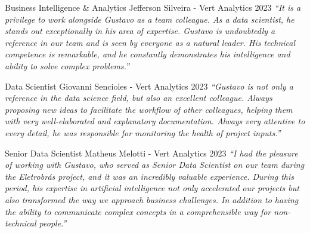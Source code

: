 \begin{cventries}
  \cventry
    {Business Intelligence \& Analytics} %
    {Jefferson Silveira - Vert Analytics} %
    {2023} %
    {} %
    {
      \textit{``It is a privilege to work alongside Gustavo as a team colleague. As a data scientist, he stands out exceptionally in his area of expertise. Gustavo is undoubtedly a reference in our team and is seen by everyone as a natural leader. His technical competence is remarkable, and he constantly demonstrates his intelligence and ability to solve complex problems.''}
    }

  \cventry
    {Data Scientist} %
    {Giovanni Sencioles - Vert Analytics} %
    {2023} %
    {} %
    {
      \textit{``Gustavo is not only a reference in the data science field, but also an excellent colleague. Always proposing new ideas to facilitate the workflow of other colleagues, helping them with very well-elaborated and explanatory documentation. Always very attentive to every detail, he was responsible for monitoring the health of project inputs.''}
    }

  \cventry
    {Senior Data Scientist} %
    {Matheus Melotti - Vert Analytics} %
    {2023} %
    {} %
    {
      \textit{``I had the pleasure of working with Gustavo, who served as Senior Data Scientist on our team during the Eletrobrás project, and it was an incredibly valuable experience. During this period, his expertise in artificial intelligence not only accelerated our projects but also transformed the way we approach business challenges. In addition to having the ability to communicate complex concepts in a comprehensible way for non-technical people.''}
    }

\end{cventries} 